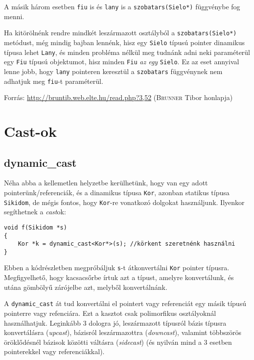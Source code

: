 \documentclass[a4paper,11.5pt,table]{article}
\begin{document}
	A másik három esetben \texttt{fiu} is és \texttt{lany} is a \texttt{szobatars(Sielo*)} függvénybe fog menni.
	
	\medskip
	Ha kitörölnénk rendre mindkét leszármazott osztályból a \texttt{szobatars(Sielo*)} metódust, még mindig bajban lennénk, hisz egy \texttt{Sielo} típusú pointer dinamikus típusa lehet \texttt{Lany}, és minden probléma nélkül meg tudnánk adni neki paraméterül egy \texttt{Fiu} típusú objektumot, hisz minden \texttt{Fiu} \textit{az egy} \texttt{Sielo}.  Ez az eset annyival lenne jobb, hogy \texttt{lany} pointeren keresztül a \texttt{szobatars} függvénynek nem adhatjuk meg \texttt{fiu}-t paraméterül.
	
	\medskip
	Forrás: \url{http://bruntib.web.elte.hu/read.php?3,52} (\textsc{Brunner} Tibor honlapja)
	
	\section{Cast-ok}
	\subsection{dynamic\_cast}
	
	Néha abba a kellemetlen helyzetbe kerülhetünk, hogy van egy adott pointerünk/referenciák, és a dinamikus típusa \texttt{Kor}, azonban statikus típusa \texttt{Sikidom}, de mégis fontos, hogy \texttt{Kor}-re vonatkozó dolgokat használjunk. Ilyenkor segíthetnek a \textit{cast}ok:
	\begin{lstlisting}
void f(Sikidom *s)
{
	Kor *k = dynamic_cast<Kor*>(s); //körkent szeretnénk használni
}
	\end{lstlisting}
	Ebben a kódrészletben megpróbáljuk \texttt{s}-t átkonvertálni \texttt{Kor} pointer típusra. Megfigyelhető, hogy kacsacsőrbe írtuk azt a típust, amelyre konvertálunk, és utána gömbölyű zárójelbe azt, melyből konvertálnánk.
	
	A \texttt{dynamic\_cast} át tud konvertálni el pointert vagy referenciát egy másik típusú pointerre vagy refenciára. Ezt a kasztot csak polimorfikus osztályoknál használhatjuk. Leginkább 3 dologra jó, leszármazott típusról bázis típusra konvertálásra (\textit{upcast}), bázisról leszármazottra (\textit{downcast}), valamint többszörös öröklődésnél bázisok közötti váltásra (\textit{sidecast}) (és nyilván mind a 3 esetben pointerekkel vagy referenciákkal).
	
\end{document}
